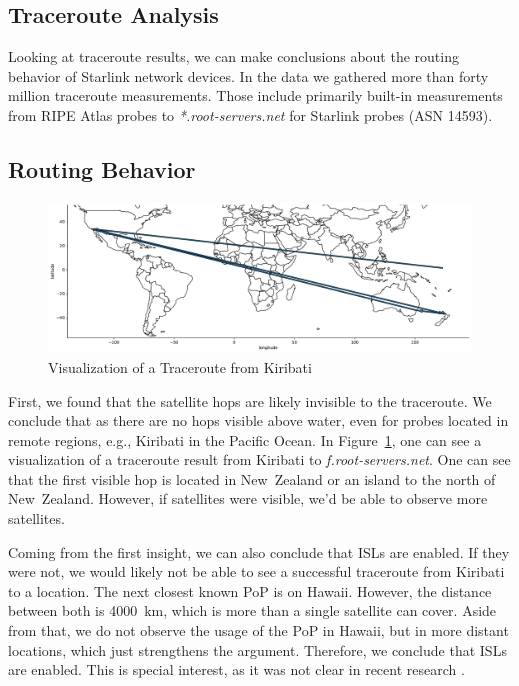 
\subsection{Traceroute Analysis} \label{sec:traceroute-analysis}

Looking at traceroute results, we can make conclusions about the routing
behavior of Starlink network devices. In the data we gathered more than forty
million traceroute measurements. Those include primarily built-in measurements
from RIPE Atlas probes to \textit{*.root-servers.net} for Starlink probes
(\ac{ASN} 14593).

\subsection*{Routing Behavior}

\begin{figure}
	\includegraphics[width=\textwidth]{chapters/4-results/img/kiribati-example-traceroute.pdf}
	\caption{Visualization of a Traceroute from Kiribati}
	\label{fig:kiribati-example-traceroute}
\end{figure}

First, we found that the satellite hops are likely invisible to the traceroute.
We conclude that as there are no hops visible above water, even for probes
located in remote regions, e.g., Kiribati in the Pacific Ocean. In
Figure~\ref{fig:kiribati-example-traceroute}, one can see a visualization of a
traceroute result from Kiribati to \textit{f.root-servers.net}. One can see
that the first visible hop is located in New~Zealand or an island to the north
of New~Zealand. However, if satellites were visible, we'd be able to observe
more satellites.

Coming from the first insight, we can also conclude that \ac{ISLs} are enabled.
If they were not, we would likely not be able to see a successful traceroute
from Kiribati to a location. The next closest known \ac{PoP} is on Hawaii.
However, the distance between both is 4000~km, which is more than a single
satellite can cover. Aside from that, we do not observe the usage of the
\ac{PoP} in Hawaii, but in more distant locations, which just strengthens the
argument. Therefore, we conclude that \ac{ISLs} are enabled. This is special
interest, as it was not clear in recent research \cite{DBLP:conf/hotnets/HauriBGS20}.


